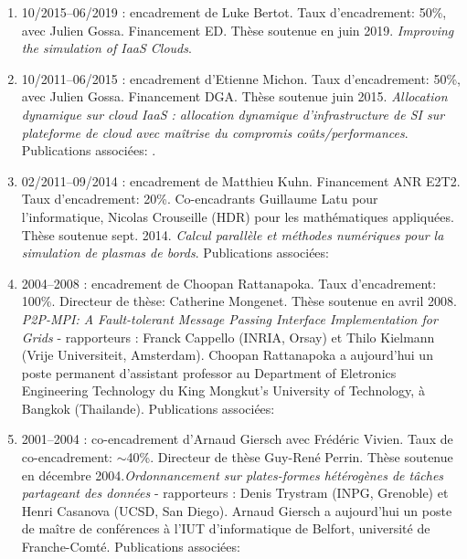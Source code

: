 \begin{enumerate}

\item 10/2015--06/2019 : encadrement de Luke Bertot. Taux d'encadrement: 50\%,
  avec Julien Gossa. Financement ED. Thèse soutenue en juin 2019. \textit{Improving the simulation of IaaS Clouds}.\\

\item 10/2011--06/2015 : encadrement d'Etienne Michon. Taux d'encadrement: 50\%,
	  avec Julien Gossa. Financement DGA. Thèse soutenue juin 2015. \emph{Allocation dynamique sur cloud IaaS : allocation dynamique d’infrastructure de SI sur plateforme de cloud avec maîtrise du compromis coûts/performances}. Publications associées: \cite{michon2012,MichonGGFB13,icps-2016-fgcs}.\\

\item 02/2011--09/2014 : encadrement de Matthieu Kuhn. Financement ANR E2T2. 
Taux d'encadrement: 20\%. Co-encadrants Guillaume Latu pour 
l'informatique, Nicolas Crouseille (HDR) pour les mathématiques appliquées. Thèse soutenue sept. 2014. \textit{Calcul parallèle et méthodes numériques pour la simulation de plasmas de bords}.
Publications associées: \cite{icps-europar-2015,KuhnLGC13,ketterlin11}\\

\item 2004--2008 : encadrement de Choopan Rattanapoka. Taux d'encadrement: 100\%. 
Directeur de thèse: Catherine Mongenet. Thèse soutenue en avril 2008.
\textit{P2P-MPI: A Fault-tolerant Message Passing Interface Implementation 
for Grids} - rapporteurs : Franck Cappello (INRIA, Orsay) et Thilo Kielmann (Vrije 
Universiteit, Amsterdam). Choopan Rattanapoka a aujourd'hui un poste permanent 
d'assistant professor au Department of Eletronics Engineering Technology du King 
Mongkut's University of Technology, à Bangkok (Thailande).
Publications associées: 
\cite{icps-2005-155,icps-2007-182,icps-2007-185,
      icps-2008-188,icps-2008-193,icps-2009-214,
	icps-2009-217,icps-book}\\


\item 2001--2004 : co-encadrement d'Arnaud Giersch avec Frédéric Vivien. 
Taux de co-encadrement: $\sim$40\%. Directeur de thèse Guy-René Perrin.
Thèse soutenue en décembre 2004.\textit{Ordonnancement 
sur plates-formes hétérogènes de tâches partageant des données} - rapporteurs : Denis 
Trystram (INPG, Grenoble) et Henri Casanova (UCSD, San Diego). Arnaud Giersch a 
aujourd'hui un poste de maître de conférences à l'IUT d'informatique de Belfort, 
université de Franche-Comté.
Publications associées: \cite{icps-2002-62,icps-2003-75,icps-2004-125}\\



\end{enumerate}
